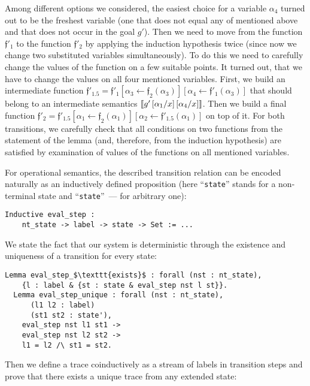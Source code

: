 Among different options we considered, the easiest choice for a variable $\alpha_4$ turned out to be the freshest variable (one that does not equal any of mentioned above and that does not occur in the goal $g'$). Then we need to move from the function ${\mathfrak f'_1}$ to the function ${\mathfrak f'_2}$ by applying the induction hypothesis twice (since now we change two substituted variables simultaneously). To do this we need to carefully change the values of the function on a few suitable points. It turned out, that we have to change the values on all four mentioned variables. First, we build an intermediate function ${\mathfrak f'_{1.5}} = {\mathfrak f'_1}[\alpha_3\gets {\mathfrak f_2}(\alpha_3)][\alpha_4\gets {\mathfrak f'_1}(\alpha_3)]$ that should belong to an intermediate semantics $\llbracket{g'\,[\alpha_1/x]\,[\alpha_4/x]}\rrbracket$. Then we build a final function ${\mathfrak f'_2} = {\mathfrak f'_{1.5}}[\alpha_1\gets {\mathfrak f_2}(\alpha_1)][\alpha_2\gets {\mathfrak f'_{1.5}}(\alpha_1)]$ on top of it. For both transitions, we carefully check that all conditions on two functions from the statement of the lemma (and, therefore, from the induction hypothesis) are satisfied by examination of values of the functions on all mentioned variables.

For operational semantics, the described transition relation can be encoded naturally as an inductively defined proposition (here ``\lstinline|state|''
stands for a non-terminal state and ``\lstinline|state|''~--- for arbitrary one):

\begin{lstlisting}[language=Coq]
  Inductive eval_step :
    nt_state -> label -> state -> Set := ...
\end{lstlisting}

We state the fact that our system is deterministic through the existence and uniqueness of a transition for every state:

\begin{lstlisting}[language=Coq]
  Lemma eval_step_$\texttt{exists}$ : forall (nst : nt_state),
    {l : label & {st : state & eval_step nst l st}}.
  Lemma eval_step_unique : forall (nst : nt_state),
      (l1 l2 : label)
      (st1 st2 : state'),
    eval_step nst l1 st1 ->
    eval_step nst l2 st2 ->
    l1 = l2 /\ st1 = st2.
\end{lstlisting}

Then we define a trace coinductively as a stream of labels in transition steps and prove that there exists a unique trace from any extended state:

